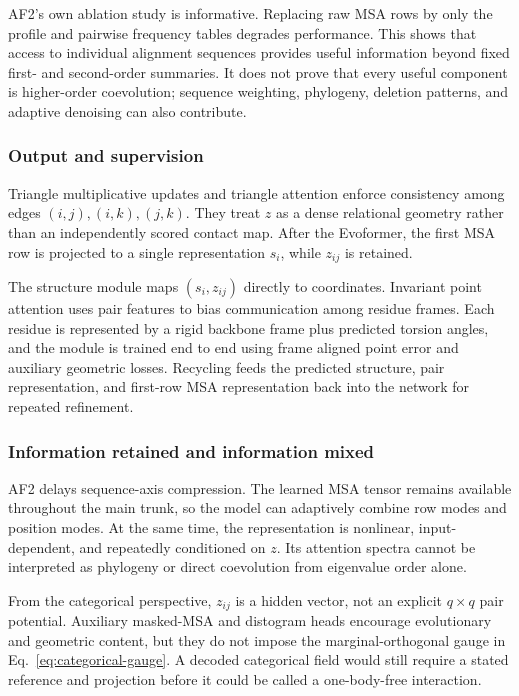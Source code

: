 \documentclass[10pt]{article}
\begin{document}
AF2's own ablation study is informative.  Replacing raw MSA rows by only the profile and pairwise
frequency tables degrades performance.  This shows that access to individual alignment sequences
provides useful information beyond fixed first- and second-order summaries.  It does not prove
that every useful component is higher-order coevolution; sequence weighting, phylogeny, deletion
patterns, and adaptive denoising can also contribute.

\subsubsection{Output and supervision}

Triangle multiplicative updates and triangle attention enforce consistency among edges
$(i,j),(i,k),(j,k)$.  They treat $z$ as a dense relational geometry rather than an independently
scored contact map.  After the Evoformer, the first MSA row is projected to a single representation
$s_i$, while $z_{ij}$ is retained.

The structure module maps $(s_i,z_{ij})$ directly to coordinates.  Invariant point attention uses
pair features to bias communication among residue frames.  Each residue is represented by a rigid
backbone frame plus predicted torsion angles, and the module is trained end to end using frame
aligned point error and auxiliary geometric losses.  Recycling feeds the predicted structure,
pair representation, and first-row MSA representation back into the network for repeated
refinement.

\subsubsection{Information retained and information mixed}

AF2 delays sequence-axis compression.  The learned MSA tensor remains available throughout the
main trunk, so the model can adaptively combine row modes and position modes.  At the same time,
the representation is nonlinear, input-dependent, and repeatedly conditioned on $z$.  Its
attention spectra cannot be interpreted as phylogeny or direct coevolution from eigenvalue order
alone.

From the categorical perspective, $z_{ij}$ is a hidden vector, not an explicit $q\times q$ pair
potential.  Auxiliary masked-MSA and distogram heads encourage evolutionary and geometric content,
but they do not impose the marginal-orthogonal gauge in Eq.~\ref{eq:categorical-gauge}.  A decoded
categorical field would still require a stated reference and projection before it could be called
a one-body-free interaction.
\end{document}
